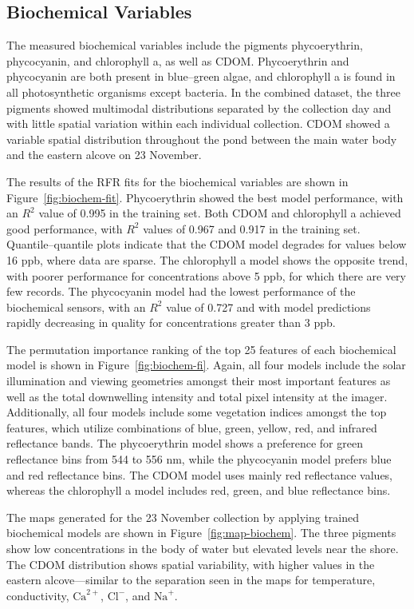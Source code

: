 \newpage

\subsection{Biochemical Variables}

The measured biochemical variables include the pigments phycoerythrin,
phycocyanin, and chlorophyll a, as well as CDOM. Phycoerythrin and phycocyanin
are both present in blue--green algae, and chlorophyll a is found in all photosynthetic organisms except bacteria. In the combined dataset, the three pigments showed multimodal distributions separated by the collection day and with little spatial variation within each individual collection. CDOM showed a variable spatial distribution throughout the pond between the main water body and the eastern alcove on 23 November.

The results of the RFR fits for the biochemical variables are shown in
Figure~\ref{fig:biochem-fit}. Phycoerythrin showed the best model performance,
with an $R^2$ value of 0.995 in the training set. Both CDOM and chlorophyll a
achieved good performance, with $R^2$ values of 0.967 and 0.917 in the training
set. Quantile--quantile plots indicate that the CDOM model degrades for values
below 16 ppb, where data are sparse. The chlorophyll a model shows the opposite trend, with poorer performance for concentrations above 5 ppb, for which there are very few records. The phycocyanin model had the lowest performance of the biochemical sensors, with an $R^2$ value of 0.727 and with model predictions rapidly decreasing in quality for concentrations greater than 3 ppb. 

The permutation importance ranking of the top 25 features of each biochemical
model is shown in Figure~\ref{fig:biochem-fi}. Again, all four models include
the solar illumination and viewing geometries amongst their most important
features as well as the total downwelling intensity and total pixel intensity at
the imager. Additionally, all four models include some vegetation indices
amongst the top features, which utilize combinations of blue, green, yellow,
red, and infrared reflectance bands. The phycoerythrin model shows a preference
for green reflectance bins from 544 to 556 nm, while the phycocyanin model
prefers blue and red reflectance bins. The CDOM model uses mainly red
reflectance values, whereas the chlorophyll a model includes red, green, and blue reflectance bins.

The maps generated for the 23 November collection by applying trained biochemical models are shown in Figure~\ref{fig:map-biochem}. The three pigments show low concentrations in the body of water but elevated levels near the shore. The CDOM distribution shows spatial variability, with higher values in the eastern alcove---similar to the separation seen in the maps for temperature, conductivity, $\textrm{Ca}^{2+}$, $\textrm{Cl}^{-}$, and $\textrm{Na}^{+}$.




